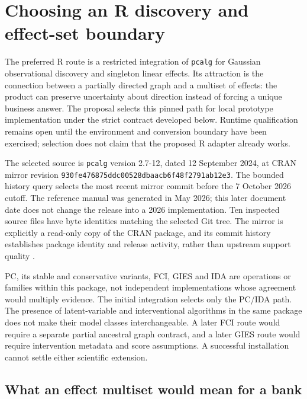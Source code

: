 \hypertarget{choosing-an-r-discovery-and-effect-set-boundary}{%
\section{Choosing an R discovery and effect-set
boundary}\label{choosing-an-r-discovery-and-effect-set-boundary}}

\label{exec13:pcalg-reuse}

The preferred R route is a restricted integration of \texttt{pcalg} for
Gaussian observational discovery and singleton linear effects. Its
attraction is the connection between a partially directed graph and a
multiset of effects: the product can preserve uncertainty about
direction instead of forcing a unique business answer. The proposal
selects this pinned path for local prototype implementation under the
strict contract developed below. Runtime qualification remains open
until the environment and conversion boundary have been exercised;
selection does not claim that the proposed R adapter already works.

The selected source is \texttt{pcalg} version 2.7-12, dated 12 September
2024, at CRAN mirror revision
\texttt{930fe476875ddc00528dbaacb6f48f2791ab12e3}. The bounded history
query selects the most recent mirror commit before the 7 October 2026
cutoff. The reference manual was generated in May 2026; this later
document date does not change the release into a 2026 implementation.
Ten inspected source files have byte identities matching the selected
Git tree. The mirror is explicitly a read-only copy of the CRAN package,
and its commit history establishes package identity and release
activity, rather than upstream support quality
\citep{exec13_pcalg,exec13_pcalg_reuse_primary}.

PC, its stable and conservative variants, FCI, GIES and IDA are
operations or families within this package, not independent
implementations whose agreement would multiply evidence. The initial
integration selects only the PC/IDA path. The presence of
latent-variable and interventional algorithms in the same package does
not make their model classes interchangeable. A later FCI route would
require a separate partial ancestral graph contract, and a later GIES
route would require intervention metadata and score assumptions. A
successful installation cannot settle either scientific extension.

\hypertarget{what-an-effect-multiset-would-mean-for-a-bank}{%
\subsection{What an effect multiset would mean for a
bank}\label{what-an-effect-multiset-would-mean-for-a-bank}}

